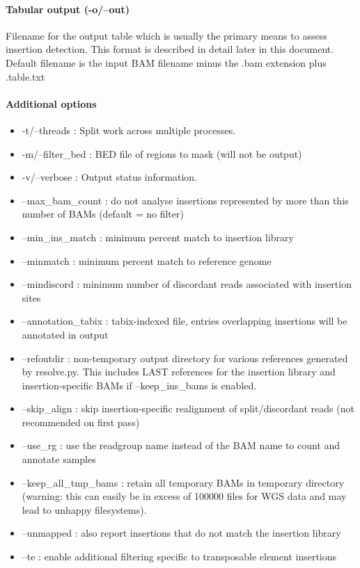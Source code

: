 \documentclass[letterpaper,11pt]{article}
\begin{document}
\paragraph{Tabular output (-o/--out)}
Filename for the output table which is usually the primary means to assess insertion detection. This format is described in detail later in this document. Default filename is the input BAM filename minus the .bam extension plus .table.txt

\paragraph{Additional options}
\begin{itemize}
\item -t/--threads : Split work across multiple processes.
\item -m/--filter\_bed : BED file of regions to mask (will not be output)
\item -v/--verbose : Output status information.
\item --max\_bam\_count : do not analyse insertions represented by more than this number of BAMs (default = no filter)
\item --min\_ins\_match : minimum percent match to insertion library
\item --minmatch : minimum percent match to reference genome
\item --mindiscord : minimum number of discordant reads associated with insertion sites
\item --annotation\_tabix : tabix-indexed file, entries overlapping insertions will be annotated in output
\item --refoutdir : non-temporary output directory for various references generated by resolve.py. This includes LAST references for the insertion library and insertion-specific BAMs if --keep\_ins\_bams is enabled.
\item --skip\_align : skip insertion-specific realignment of split/discordant reads (not recommended on first pass)
\item --use\_rg : use the readgroup name instead of the BAM name to count and annotate samples
\item --keep\_all\_tmp\_bams : retain all temporary BAMs in temporary directory (warning: this can easily be in excess of 100000 files for WGS data and may lead to unhappy filesystems).
\item --unmapped : also report insertions that do not match the insertion library
\item --te : enable additional filtering specific to transposable element insertions

\end{itemize}
\end{document}
